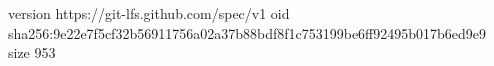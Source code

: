version https://git-lfs.github.com/spec/v1
oid sha256:9e22e7f5cf32b56911756a02a37b88bdf8f1c753199be6ff92495b017b6ed9e9
size 953
